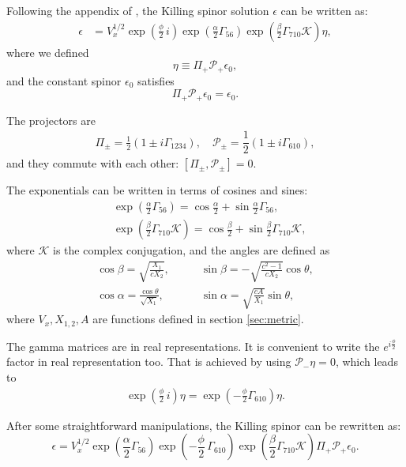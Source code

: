 
Following the appendix of \cite{Chen-Lin:2015xlh}, the Killing spinor solution $\epsilon$ can be written as:
\begin{align}
\epsilon &= V_x^{1/2} \exp{\left(\frac{\phi}{2}\, i \right)} \exp{\left(\frac{\alpha}{2}\Gamma_{56} \right)} \exp{\left(\frac{\beta}{2}\Gamma_{7 10} \mathcal{K} \right)} \eta,
\end{align}
where we defined
\begin{equation}
\eta \equiv \Pi_{+} \mathcal{P}_+ \epsilon_0,
\end{equation}
and the constant spinor $\epsilon_0$ satisfies
\begin{equation}
 \Pi_+ \mathcal{P}_+ \epsilon_0 = \epsilon_0.
\end{equation}

The projectors are
\begin{align}\label{eq:projectors}
\Pi_\pm = 
\frac{1}{2}\left(1 \pm i\Gamma_{1234}\right), 
\quad
\mathcal{P}_{\pm} =
\dfrac{1}{2} \left(1\pm i\Gamma_{6 10}\right),
\end{align}
and they commute with each other: $[\Pi_\pm, \mathcal{P}_{\pm}]=0$. 


The exponentials can be written in terms of cosines and sines:
\begin{align}
&\exp{\left(\frac{\alpha}{2}\Gamma_{56} \right)} = \cos\frac{\alpha}{2} + \sin\frac{\alpha}{2}\Gamma_{5 6},\\
&\exp{\left(\frac{\beta}{2}\Gamma_{7 10} \mathcal{K} \right)} = \cos\frac{\beta}{2} + \sin\frac{\beta}{2}\Gamma_{7 10}\mathcal{K},
\end{align}
where $\mathcal{K}$ is the complex conjugation, and the angles are defined as
\begin{align}
\cos\beta = \sqrt{\frac{X_1}{c X_2}}, \quad 
&\quad
\sin\beta = -\sqrt{\frac{c^2 - 1}{c X_2}}\cos\theta,\\
%
\cos\alpha = \frac{\cos\theta}{\sqrt{X_1}}, 
&\quad
\sin\alpha = \sqrt{\frac{c A}{X_1}}\sin\theta,
\end{align}
where $V_x, X_{1,2}, A$ are functions defined in section \ref{sec:metric}.


The gamma matrices are in real representations. It is convenient to write the $e^{i \frac{\phi}{2}}$ factor in real representation too. 
That is achieved by using $\mathcal{P}_- \eta = 0 $, which leads to
\begin{align}
 \exp{\left(\frac{\phi}{2}\, i \right)} \eta 
    = \exp{\left(-\frac{\phi}{2}\Gamma_{6 10} \right)} \eta. 
\end{align}

After some straightforward manipulations, the Killing spinor can be rewritten as:
\begin{equation}\label{eq:KillingSpinor}
\epsilon =  V_x^{1/2} \exp{\left(\frac{\alpha}{2}\Gamma_{56} \right)} \exp{\left(-\frac{\phi}{2}\, \Gamma_{6 10} \right)} \exp{\left(\frac{\beta}{2}\Gamma_{7 10} \mathcal{K} \right)} \Pi_{+} \mathcal{P}_+ \epsilon_0.
\end{equation}


